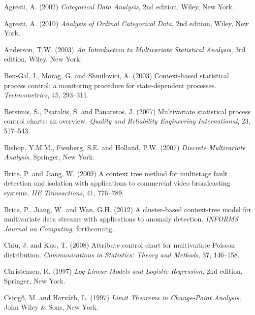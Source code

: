 

\begin{thebibliography}{}

\item Agresti, A. (2002) {\it Categorical Data Analysis}, 2nd
edition, Wiley, New York.

\item Agresti, A. (2010) {\it Analysis of Ordinal Categorical Data},
2nd edition, Wiley, New York.

\item Anderson, T.W. (2003) {\it An Introduction to Multivariate
Statistical Analysis}, 3rd edition, Wiley, New York.

\item Ben-Gal, I., Morag, G. and Shmilovici, A. (2003) Context-based statistical
process control: a monitoring procedure for state-dependent processes. {\it
Technometrics}, 45, 293--311.

\item Bersimis, S., Psarakis, S. and Panaretos, J. (2007) Multivariate
statistical process control charts: an overview. {\it Quality and Reliability
Engineering International}, 23, 517--543.

\item Bishop, Y.M.M., Fienberg, S.E. and Holland, P.W. (2007) {\it Discrete Multivariate
Analysis}, Springer, New York.

\item Brice, P. and  Jiang, W. (2009) A context tree  method  for multistage
fault detection and isolation with applications to commercial video broadcasting
systems. {\it IIE  Transactions}, 41, 776--789.

\item Brice, P., Jiang, W. and Wan, G.H. (2012) A cluster-based context-tree
model for multivariate data streams with applications to anomaly detection. {\it
INFORMS Journal on Computing}, forthcoming.

\item Chiu, J. and Kuo, T. (2008) Attribute control chart for multivariate Poisson
distribution. {\it Communications in Statistics: Theory and Methods}, 37, 146--158.

\item Christensen, R. (1997) {\it Log-Linear Models and Logistic Regression},
2nd edition, Springer, New York.

\item Cs\"{o}rg\H{o}, M. and Horv\'{a}th, L. (1997) {\it Limit Theorems in Change-Point
Analysis}, John Wiley \& Sons, New York.


\end{thebibliography}
